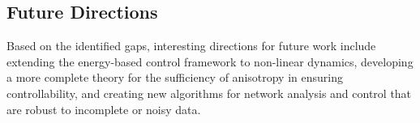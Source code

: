 \documentclass[10pt, a4paper]{article}
\begin{document}
\subsection{Future Directions}
Based on the identified gaps, interesting directions for future work include extending the energy-based control framework to non-linear dynamics, developing a more complete theory for the sufficiency of anisotropy in ensuring controllability, and creating new algorithms for network analysis and control that are robust to incomplete or noisy data.



\printbibliography[title={References}]
\end{document}
